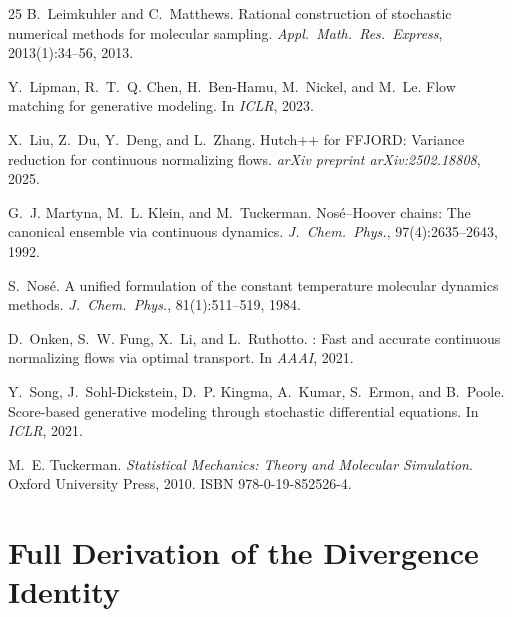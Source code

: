 \documentclass[11pt]{article}
\begin{document}
\begin{thebibliography}{25}
B.~Leimkuhler and C.~Matthews.
\newblock Rational construction of stochastic numerical methods for molecular
  sampling.
\newblock \emph{Appl.\ Math.\ Res.\ Express}, 2013(1):34--56, 2013.

Y.~Lipman, R.~T.~Q. Chen, H.~Ben-Hamu, M.~Nickel, and M.~Le.
\newblock Flow matching for generative modeling.
\newblock In \emph{ICLR}, 2023.

X.~Liu, Z.~Du, Y.~Deng, and L.~Zhang.
\newblock Hutch++ for {FFJORD}: Variance reduction for continuous normalizing
  flows.
\newblock \emph{arXiv preprint arXiv:2502.18808}, 2025.

G.~J. Martyna, M.~L. Klein, and M.~Tuckerman.
\newblock Nos\'{e}--{H}oover chains: The canonical ensemble via continuous
  dynamics.
\newblock \emph{J.~Chem.\ Phys.}, 97(4):2635--2643, 1992.

S.~Nos\'{e}.
\newblock A unified formulation of the constant temperature molecular dynamics
  methods.
\newblock \emph{J.~Chem.\ Phys.}, 81(1):511--519, 1984.

D.~Onken, S.~W. Fung, X.~Li, and L.~Ruthotto.
: Fast and accurate continuous normalizing flows via optimal
  transport.
\newblock In \emph{AAAI}, 2021.

Y.~Song, J.~Sohl-Dickstein, D.~P. Kingma, A.~Kumar, S.~Ermon, and B.~Poole.
\newblock Score-based generative modeling through stochastic differential
  equations.
\newblock In \emph{ICLR}, 2021.

M.~E. Tuckerman.
\newblock \emph{Statistical Mechanics: Theory and Molecular Simulation}.
\newblock Oxford University Press, 2010.
\newblock ISBN 978-0-19-852526-4.

\end{thebibliography}

\newpage
\appendix
\section{Full Derivation of the Divergence Identity}
\label{app:derivation}
\end{document}
